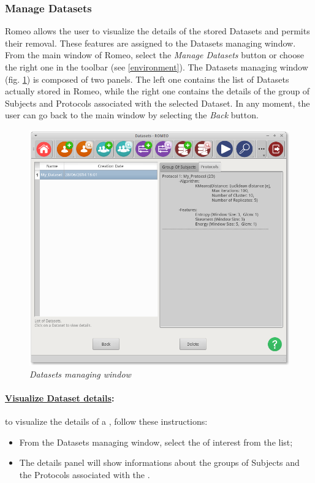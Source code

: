 \subsubsection{Manage Datasets}
\label{managedataset}
Romeo allows the user to visualize the details of the stored Datasets\g{} and permits their removal. These features are assigned to the Datasets\g{} managing window.\\
From the main window of Romeo, select the \textit{Manage Datasets} button or choose the right one in the toolbar (see \ref{environment}). The Datasets\g{} managing window (fig. \ref{managedatasetimg}) is composed of two panels. The left one contains the list of Datasets\g{} actually stored in Romeo, while the right one contains the details of the group of Subjects\g{} and Protocols\g{} associated with the selected Dataset\g{}. In any moment, the user can go back to the main window by selecting the \textit{Back} button.
\begin{figure}[!h]
\begin{center}
\includegraphics[scale=0.4]{./Images/ViewDatasets}
\caption{\textit{Datasets managing window}}
\label{managedatasetimg}
\end{center}
\end{figure}

\paragraph{\underline{Visualize Dataset details}:} to visualize the details of a \dataset{}, follow these instructions:
\begin{itemize}
\item From the Datasets\g{} managing window, select the \dataset{} of interest from the list;
\item The details panel will show informations about the groups of Subjects\g{} and the Protocols\g{} associated with the \dataset{}.
\end{itemize}

